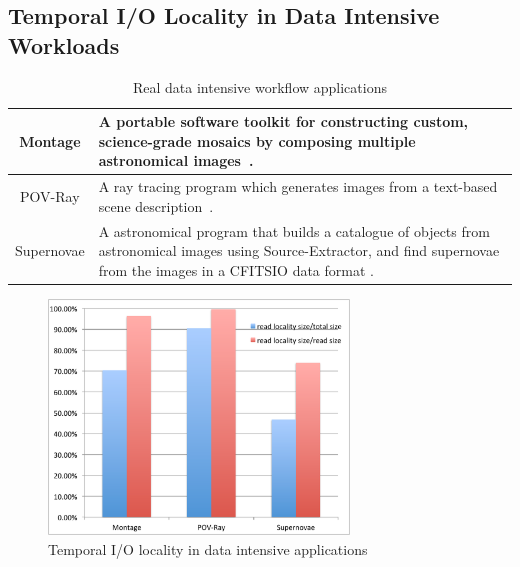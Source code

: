  



\subsection{Temporal I/O Locality in Data Intensive Workloads}
\label{ssec:data_access_locality}

\begin{table}
\centering
\begin{tabular}{|c|p{150pt}|}
\hline
\cellcolor{lightgray} Montage	&
 A portable software toolkit for constructing custom, science-grade mosaics by
 composing multiple astronomical images~\cite{montage}.\\\hline 
\cellcolor{lightgray} POV-Ray   &
 A ray tracing program which generates images
 from a text-based scene description~\cite{povray}.\\\hline
\cellcolor{lightgray} Supernovae &	
 A astronomical program that builds a catalogue of
objects from astronomical images using Source-Extractor\cite{SExtractor}, 
and find supernovae from the images in a CFITSIO data format \cite{fitsio}.
\\ \hline
\end{tabular}
\caption{Real data intensive workflow applications}
\label{background:work flow applications}
\end{table}

\begin{figure}
\centering
\includegraphics[width=8cm]{img/data_locality.pdf}
\caption{Temporal I/O locality in data intensive applications}
\label{background:data locality}
\end{figure}

